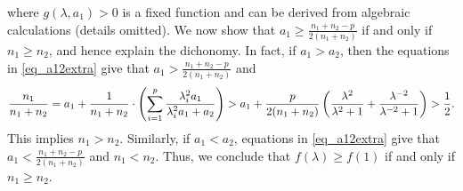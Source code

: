 where $g(\lambda, a_1) > 0$ is a fixed function and can be derived from algebraic calculations (details omitted).
We now show that $a_1 \ge \frac{n_1 + n_2-p}{2(n_1 + n_2 )}$ if and only if $n_1 \ge n_2$, and hence explain the dichonomy. 
In fact, if $a_1>a_2$, then the equations in \eqref{eq_a12extra} give that $a_1> \frac{n_1 + n_2-p}{2 (n_1 + n_2)}$ and
$$ 
 \frac{n_1}{n_1 + n_2}=a_1 + \frac1{n_1 + n_2}\cdot \left({\sum_{i=1}^p \frac{\lambda_i^2 a_1}{\lambda_i^2 a_1 + a_2}}\right) 
> a_1 + \frac{p}{2(n_1+n_2)} \left(\frac{\lambda^2}{\lambda^2+1}+\frac{\lambda^{-2}}{\lambda^{-2}+1}\right) >\frac{1}{2}. 
$$
This implies $n_1>n_2$. Similarly, if $a_1<a_2$, equations in \eqref{eq_a12extra} give that $a_1 < \frac{n_1 + n_2-p}{2 (n_1 + n_2)}$ and $n_1<n_2$. Thus, we conclude that $f(\lambda) \ge f(1)$ if and only if $n_1 \ge n_2$. 


\iffalse
Hence, when $n_1 \ge n_2$, we have that $a_1 \ge a_2$, which gives $a_1 \ge \frac{1}{2}(1 - \frac{p}{n_1 + n_2 }) = \frac{n_1 + n_2-p}{2 (n_1 + n_2)}$.
The other case when $n_1 < n_2$ is similar.
A formal proof follows from a study of the self-consistent equations \eqref{eq_a12extra} and we omit the details.
Thus, we conclude that $f(\lambda) \ge f(1)$ if and only if $n_1 \ge n_2$.  If $n_1< n_2$, then $f(\lambda)< f(1)$.
\fi


